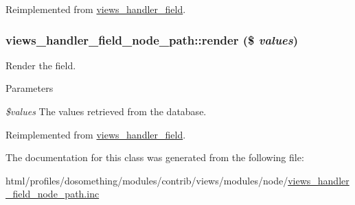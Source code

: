 Reimplemented from \hyperlink{classviews__handler__field_a4f661f91bcbe80d4a00c30a31456c502}{views\_\-handler\_\-field}.\hypertarget{classviews__handler__field__node__path_a94067b369f0f373515cae33ad940ae2f}{
\subsubsection[{render}]{\setlength{\rightskip}{0pt plus 5cm}views\_\-handler\_\-field\_\-node\_\-path::render (\$ {\em values})}}
\label{classviews__handler__field__node__path_a94067b369f0f373515cae33ad940ae2f}
Render the field.


\begin{DoxyParams}{Parameters}
\item[{\em \$values}]The values retrieved from the database. \end{DoxyParams}


Reimplemented from \hyperlink{classviews__handler__field_a82ff951c5e9ceb97b2eab86f880cbc1e}{views\_\-handler\_\-field}.

The documentation for this class was generated from the following file:\begin{DoxyCompactItemize}
\item 
html/profiles/dosomething/modules/contrib/views/modules/node/\hyperlink{views__handler__field__node__path_8inc}{views\_\-handler\_\-field\_\-node\_\-path.inc}\end{DoxyCompactItemize}
